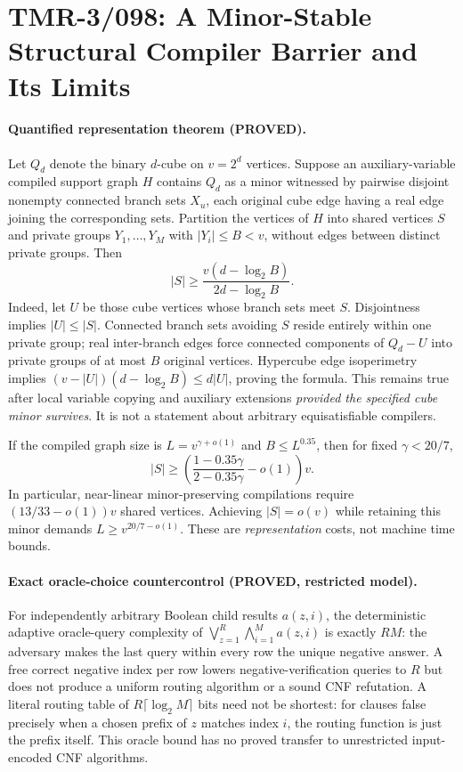 \documentclass[11pt]{article}
\begin{document}
\section{TMR-3/098: A Minor-Stable Structural Compiler Barrier and Its Limits}
\label{sec:tmr3-minor-compiler098}
\paragraph{Quantified representation theorem (PROVED).}
Let $Q_d$ denote the binary $d$-cube on $v=2^d$ vertices.
Suppose an auxiliary-variable compiled support graph $H$ contains
$Q_d$ as a minor witnessed by pairwise disjoint nonempty connected
branch sets $X_u$, each original cube edge having a real edge joining
the corresponding sets. Partition the vertices of $H$ into shared
vertices $S$ and private groups $Y_1,\ldots,Y_M$ with
$|Y_i|\le B<v$, without edges between distinct private groups.
Then
\[
 |S|\ge \frac{v(d-\log_2 B)}{2d-\log_2 B}.
\]
Indeed, let $U$ be those cube vertices whose branch sets meet $S$.
Disjointness implies $|U|\le |S|$. Connected branch sets avoiding
$S$ reside entirely within one private group; real inter-branch
edges force connected components of $Q_d-U$ into private groups
of at most $B$ original vertices. Hypercube edge isoperimetry
implies $(v-|U|)(d-\log_2 B)\le d|U|$, proving the formula.
This remains true after local variable copying and auxiliary
extensions \emph{provided the specified cube minor survives}.
It is not a statement about arbitrary equisatisfiable compilers.

If the compiled graph size is $L=v^{\gamma+o(1)}$ and
$B\le L^{0.35}$, then for fixed $\gamma<20/7$,
\[
 |S|\ge \left(\frac{1-0.35\gamma}{2-0.35\gamma}-o(1)\right)v.
\]
In particular, near-linear minor-preserving compilations
require $(13/33-o(1))v$ shared vertices. Achieving $|S|=o(v)$
while retaining this minor demands $L\ge v^{20/7-o(1)}$.
These are \emph{representation} costs, not machine time bounds.

\paragraph{Exact oracle-choice countercontrol (PROVED, restricted model).}
For independently arbitrary Boolean child results $a(z,i)$,
the deterministic adaptive oracle-query complexity of
$\bigvee_{z=1}^R\bigwedge_{i=1}^M a(z,i)$ is exactly $RM$:
the adversary makes the last query within every row the unique
negative answer. A free correct negative index per row lowers
negative-verification queries to $R$ but does not produce
a uniform routing algorithm or a sound CNF refutation.
A literal routing table of $R\lceil\log_2 M\rceil$ bits need
not be shortest: for clauses false precisely when a chosen
prefix of $z$ matches index $i$, the routing function is just
the prefix itself. This oracle bound has no proved transfer to
unrestricted input-encoded CNF algorithms.
\end{document}
